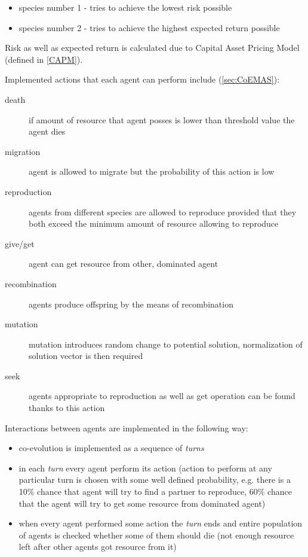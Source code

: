 \begin{itemize}
  \item species number 1 - tries to achieve the lowest risk possible
  \item species number 2 - tries to achieve the highest expected return possible
\end{itemize}

Risk as well as expected return is calculated due to Capital Asset Pricing Model (defined in \ref{CAPM}).

Implemented actions that each agent can perform include (\ref{sec:CoEMAS}):

\begin{description}
  \item [death]
      if amount of resource that agent posses is lower than threshold value the agent dies
  \item [migration]
      agent is allowed to migrate but the probability of this action is low
  \item [reproduction]
      agents from different species are allowed to reproduce provided that they both exceed the minimum amount of resource allowing to reproduce
  \item [give/get]
      agent can get resource from other, dominated agent
  \item [recombination]
      agents produce offspring by the means of recombination
  \item [mutation]
      mutation introduces random change to potential solution, normalization of solution vector is then required 
  \item [seek]
      agents appropriate  to reproduction as well as get operation can be found thanks to this action
\end{description}

Interactions between agents are implemented in the following way:
\begin{itemize}
  \item co-evolution is implemented as a sequence of \emph{turns}
  \item in each \emph{turn} every agent perform its action (action to perform at any particular turn is chosen with some well defined probability, e.g. there is a 10\% chance that agent will try to find
	a partner to reproduce, 60\% chance that the agent will try to get some resource from dominated agent)
  \item when every agent performed some action the \emph{turn} ends and entire population of agents is checked whether some of them should die (not enough resource left after other agents got resource
	from it)
\end{itemize}


